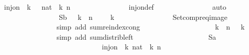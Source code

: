 \begin{isabellebody}
\ {\isachardoublequoteopen}inj{\isacharunderscore}on\ {\isacharparenleft}{\isasymlambda}\ k{\isachardot}\ {}\ {\isacharasterisk}\ {\isacharparenleft}{}{\isacharcolon}{\isacharcolon}nat{\isacharparenright}\ {\isacharcircum}\ k{\isacharparenright}\ {\isacharbraceleft}{}{\isachardot}{\isachardot}{\isacharless}n{\isacharbraceright}{\isachardoublequoteclose}\isanewline
\ \ \ \ \ \ \ \ \ \ \ \ \ \ \isamarkupfalse%
\ inj{\isacharunderscore}on{\isacharunderscore}def\isanewline
\ \ \ \ \ \ \ \ \ \ \ \ \ \ \isamarkupfalse%
\ auto\isanewline
\ \ \ \ \ \ \ \ \ \ \ \ \isamarkupfalse%
\ \isamarkupfalse%
\ {\isachardoublequoteopen}{\isasymSum}\ {\isacharquery}Sb\ {\isacharequal}\ {\isacharparenleft}{\isasymSum}\ k\ {\isasymin}\ {\isacharbraceleft}{}{\isachardot}{\isachardot}{\isacharless}n{\isacharbraceright}{\isachardot}\ {}\ {\isacharasterisk}\ {}\ {\isacharcircum}\ k{\isacharparenright}{\isachardoublequoteclose}\isanewline
\ \ \ \ \ \ \ \ \ \ \ \ \ \ \isamarkupfalse%
\ Setcompr{\isacharunderscore}eq{\isacharunderscore}image\isanewline
\ \ \ \ \ \ \ \ \ \ \ \ \ \ \isamarkupfalse%
\ {\isacharparenleft}simp\ add{\isacharcolon}\ sum{\isachardot}reindex{\isacharunderscore}cong{\isacharparenright}\isanewline
\ \ \ \ \ \ \ \ \ \ \ \ \isamarkupfalse%
\ \isamarkupfalse%
\ {\isachardoublequoteopen}{\isachardot}{\isachardot}{\isachardot}\ {\isacharequal}\ {}\ {\isacharasterisk}\ {\isacharparenleft}{\isasymSum}\ k\ {\isasymin}\ {\isacharbraceleft}{}{\isachardot}{\isachardot}{\isacharless}n{\isacharbraceright}{\isachardot}\ {}\ {\isacharcircum}\ k{\isacharparenright}{\isachardoublequoteclose}\isanewline
\ \ \ \ \ \ \ \ \ \ \ \ \ \ \isamarkupfalse%
\ {\isacharparenleft}simp\ add{\isacharcolon}\ sum{\isacharunderscore}distrib{\isacharunderscore}left{\isacharparenright}\isanewline
\ \ \ \ \ \ \ \ \ \ \ \ \isamarkupfalse%
\ \isamarkupfalse%
\ {\isachardoublequoteopen}{\isachardot}{\isachardot}{\isachardot}\ {\isacharequal}\ {}\ {\isacharasterisk}\ {\isacharparenleft}{\isasymSum}\ {\isacharquery}Sa{\isacharparenright}{\isachardoublequoteclose}\isanewline
\ \ \ \ \ \ \ \ \ \ \ \ \isamarkupfalse%
{\isacharminus}\isanewline
\ \ \ \ \ \ \ \ \ \ \ \ \ \ \isamarkupfalse%
\ {\isachardoublequoteopen}inj{\isacharunderscore}on\ {\isacharparenleft}{\isasymlambda}\ k{\isachardot}\ {\isacharparenleft}{}{\isacharcolon}{\isacharcolon}nat{\isacharparenright}\ {\isacharcircum}\ k{\isacharparenright}\ {\isacharbraceleft}{}{\isachardot}{\isachardot}{\isacharless}n{\isacharbraceright}{\isachardoublequoteclose}\isanewline

\end{isabellebody}
